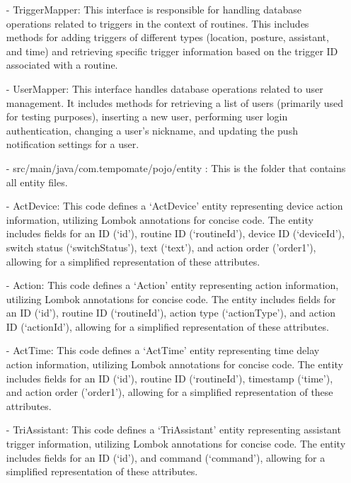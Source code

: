 \begin{enumerate}
                        \item[-] TriggerMapper: This interface is responsible for handling database operations related to triggers in the context of routines. This includes methods for adding triggers of different types (location, posture, assistant, and time) and retrieving specific trigger information based on the trigger ID associated with a routine. \\
                        \item[-] UserMapper: This interface handles database operations related to user management. It includes methods for retrieving a list of users (primarily used for testing purposes), inserting a new user, performing user login authentication, changing a user's nickname, and updating the push notification settings for a user. \\
                        \item[-] src/main/java/com.tempomate/pojo/entity : This is the folder that contains all entity files. \\
                        \item[-] ActDevice: This code defines a ‘ActDevice' entity representing device action information, utilizing Lombok annotations for concise code. The entity includes fields for an ID (‘id’), routine ID (‘routineId’), device ID (‘deviceId’), switch status (‘switchStatus’), text (‘text’), and action order ('order1'), allowing for a simplified representation of these attributes.\\
                        \item[-] Action: This code defines a ‘Action' entity representing action information, utilizing Lombok annotations for concise code. The entity includes fields for an ID (‘id’), routine ID (‘routineId’), action type (‘actionType’), and action ID (‘actionId’), allowing for a simplified representation of these attributes. \\
                        \item[-] ActTime: This code defines a ‘ActTime' entity representing time delay action information, utilizing Lombok annotations for concise code. The entity includes fields for an ID (‘id’), routine ID (‘routineId’), timestamp (‘time’), and action order ('order1'), allowing for a simplified representation of these attributes.\\
                        \item[-] TriAssistant: This code defines a ‘TriAssistant' entity representing assistant trigger information, utilizing Lombok annotations for concise code. The entity includes fields for an ID (‘id’), and command (‘command’), allowing for a simplified representation of these attributes.\\

\end{enumerate}
